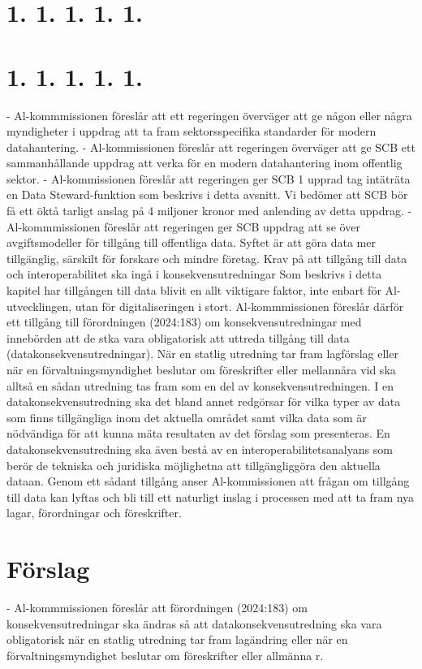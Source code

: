 {{{{{{{{{\section*{1. 1. 1. 1. 1.}
\section*{1. 1. 1. 1. 1.}
- Al-kommmissionen föreslår att ett regeringen överväger att ge någon eller några myndigheter i uppdrag att ta fram sektorsspecifika standarder för modern datahantering.
- Al-kommissionen föreslår att regeringen överväger att ge SCB ett sammanhållande uppdrag att verka för en modern datahantering inom offentlig sektor.
- Al-kommissionen föreslår att regeringen ger SCB 1 upprad tag intäträta en Data Steward-funktion som beskrivs i detta avsnitt. Vi bedömer att SCB bör få ett öktå tarligt anslag på 4 miljoner kronor med anlending av detta uppdrag.
- Al-kommmissionen föreslår att regeringen ger SCB uppdrag att se över avgiftsmodeller för tillgång till offentliga data. Syftet är att göra data mer tillgänglig, särskilt för forskare och mindre företag.
Krav på att tillgång till data och interoperabilitet ska ingå i konsekvensutredningar
Som beskrivs i detta kapitel har tillgången till data blivit en allt viktigare faktor, inte enbart för Al-utvecklingen, utan för digitaliseringen i stort. Al-kommmissionen föreslår därför ett tillgång till förordningen (2024:183) om konsekvensutredningar med innebörden att de stka vara obligatorisk att uttreda tillgång till data (datakonsekvensutredningar). När en statlig utredning tar fram lagförslag eller när en förvaltningsmyndighet beslutar om föreskrifter eller mellannåra vid ska alltså en sådan utredning tas fram som en del av konsekvensutredningen.
I en datakonsekvensutredning ska det bland annet redgörsar för vilka typer av data som finns tillgängliga inom det aktuella området samt vilka data som är nödvändiga för att kunna mäta resultaten av det förslag som presenteras. En datakonsekvensutredning ska även bestå av en interoperabilitetsanalyans som berör de tekniska och juridiska möjlighetna att tillgängliggöra den aktuella dataan. Genom ett sådant tillgång anser Al-kommissionen att frågan om tillgång till data kan lyftas och bli till ett naturligt inslag i processen med att ta fram nya lagar, förordningar och föreskrifter.
\section*{Förslag}
- Al-kommmissionen föreslår att förordningen (2024:183) om konsekvensutredningar ska ändras så att datakonsekvensutredning ska vara obligatorisk när en statlig utredning tar fram lagändring eller när en förvaltningsmyndighet beslutar om föreskrifter eller allmänna r.

}}}}}}}}}
